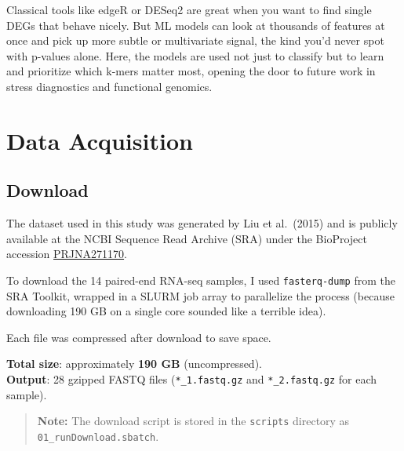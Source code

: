 \documentclass[
]{book}
\begin{document}
Classical tools like edgeR or DESeq2 are great when you want to find single DEGs that behave nicely. But ML models can look at thousands of features at once and pick up more subtle or multivariate signal, the kind you'd never spot with p-values alone. Here, the models are used not just to classify but to learn and prioritize which k-mers matter most, opening the door to future work in stress diagnostics and functional genomics.

\hypertarget{data-acquisition}{%
\chapter{Data Acquisition}\label{data-acquisition}}

\hypertarget{download}{%
\section{Download}\label{download}}

The dataset used in this study was generated by Liu et al.~(2015) and is publicly available at the NCBI Sequence Read Archive (SRA) under the BioProject accession \href{https://www.ncbi.nlm.nih.gov/bioproject/PRJNA271170}{PRJNA271170}.

To download the 14 paired-end RNA-seq samples, I used \texttt{fasterq-dump} from the SRA Toolkit, wrapped in a SLURM job array to parallelize the process (because downloading 190 GB on a single core sounded like a terrible idea).

Each file was compressed after download to save space.

\textbf{Total size}: approximately \textbf{190 GB} (uncompressed).\\
\textbf{Output}: 28 gzipped FASTQ files (\texttt{*\_1.fastq.gz} and \texttt{*\_2.fastq.gz} for each sample).

\begin{quote}
\textbf{Note:} The download script is stored in the \texttt{scripts} directory as \texttt{01\_runDownload.sbatch}.
\end{quote}
\end{document}
